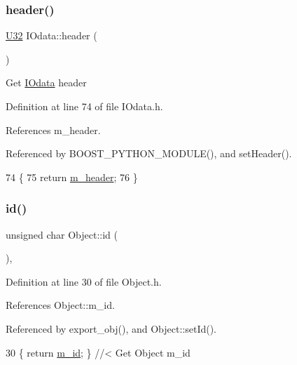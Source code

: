 \subsubsection{\texorpdfstring{header()}{header()}}
{\footnotesize\ttfamily \hyperlink{classIOdata_a96fb57f5fcd87b708743abd3c86a5198}{U32} I\+Odata\+::header (\begin{DoxyParamCaption}{ }\end{DoxyParamCaption})\hspace{0.3cm}{\ttfamily [inline]}}

Get \hyperlink{classIOdata}{I\+Odata} header 

Definition at line 74 of file I\+Odata.\+h.



References m\+\_\+header.



Referenced by B\+O\+O\+S\+T\+\_\+\+P\+Y\+T\+H\+O\+N\+\_\+\+M\+O\+D\+U\+L\+E(), and set\+Header().


\begin{DoxyCode}
74               \{
75     \textcolor{keywordflow}{return} \hyperlink{classIOdata_a46ec7dbfa257c02be1d39c4799f157d3}{m\_header};
76   \}
\end{DoxyCode}
\mbox{\label{classObject_af99145335cc61ff6e2798ea17db009d2}} 
\subsubsection{\texorpdfstring{id()}{id()}}
{\footnotesize\ttfamily unsigned char Object\+::id (\begin{DoxyParamCaption}{ }\end{DoxyParamCaption})\hspace{0.3cm}{\ttfamily [inline]}, {\ttfamily [inherited]}}



Definition at line 30 of file Object.\+h.



References Object\+::m\+\_\+id.



Referenced by export\+\_\+obj(), and Object\+::set\+Id().


\begin{DoxyCode}
30 \{ \textcolor{keywordflow}{return} \hyperlink{classObject_aca74b9dbfed7b5556ea2d56c65b6b6b0}{m\_id};         \} \textcolor{comment}{//< Get Object m\_id }
\end{DoxyCode}
\mbox{\label{classObject_a644fd329ea4cb85f54fa6846484b84a8}} 

